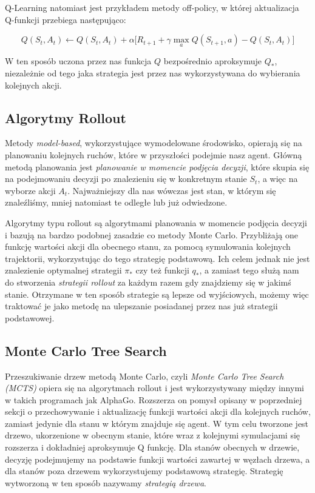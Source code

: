 \documentclass[licencjacka]{pracamgr}
\begin{document}
Q-Learning natomiast jest przykładem metody off-policy, w której aktualizacja Q-funkcji przebiega następująco:

$$ Q(S_t, A_t) \leftarrow Q(S_t, A_t) + \alpha \big[R_{t+1} + \gamma \max_a Q(S_{t+1}, a) - Q(S_t, A_t) \big] $$

W ten sposób uczona przez nas funkcja $Q$ bezpośrednio aproksymuje $Q_\ast$, niezależnie od tego jaka strategia jest przez nas wykorzystywana do wybierania kolejnych akcji.

\subsection{Algorytmy Rollout}

Metody \emph{model-based}, wykorzystujące wymodelowane środowisko, opierają się na planowaniu kolejnych ruchów, które w przyszłości podejmie nasz agent. Główną metodą planowania jest \emph{planowanie w momencie podjęcia decyzji}, które skupia się na podejmowaniu decyzji po znalezieniu się w konkretnym stanie $S_t$, a więc na wyborze akcji $A_t$. Najważniejszy dla nas wówczas jest stan, w którym się znaleźliśmy, mniej natomiast te odległe lub już odwiedzone. 

Algorytmy typu rollout są algorytmami planowania w momencie podjęcia decyzji  i bazują na bardzo podobnej zasadzie co metody Monte Carlo. Przybliżają one funkcję wartości akcji dla obecnego stanu, za pomocą symulowania kolejnych trajektorii, wykorzystując do tego strategię podstawową. Ich celem jednak nie jest znalezienie optymalnej strategii $\pi_\ast$ czy też funkcji $q_\ast$, a zamiast tego służą nam do stworzenia \emph{strategii rollout} za każdym razem gdy znajdziemy się w jakimś stanie. Otrzymane w ten sposób strategie są lepsze od wyjściowych, możemy więc traktować je jako metodę na ulepszanie posiadanej przez nas już strategii podstawowej.

\subsection{Monte Carlo Tree Search}

Przeszukiwanie drzew metodą Monte Carlo, czyli \emph{Monte Carlo Tree Search (MCTS)} \cite{MCTS} opiera się na algorytmach rollout i jest wykorzystywany między innymi w takich programach jak AlphaGo\cite{alphago2016, alphagozero}. 
Rozszerza on pomysł opisany w poprzedniej sekcji o przechowywanie i aktualizację funkcji wartości akcji dla kolejnych ruchów, zamiast jedynie dla stanu w którym znajduje się agent. W tym celu tworzone jest drzewo, ukorzenione w obecnym stanie, które wraz z kolejnymi symulacjami się rozszerza i dokładniej aproksymuje Q funkcję. Dla stanów obecnych w drzewie, decyzję podejmujemy na podstawie funkcji wartości zawartej w węzłach drzewa, a dla stanów poza drzewem wykorzystujemy podstawową strategię. Strategię wytworzoną w ten sposób nazywamy \emph{strategią drzewa}.
\end{document}
